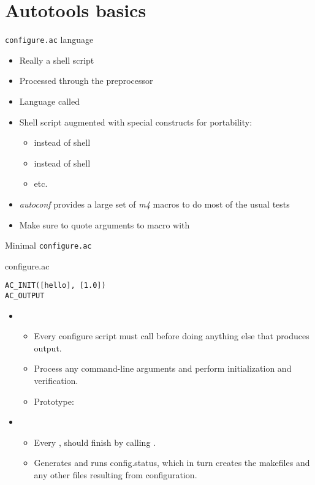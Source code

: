 \section{Autotools basics}

\begin{frame}{{\tt configure.ac} language}
  \begin{itemize}
  \item Really a shell script
  \item Processed through the  preprocessor
  \item Language called 
  \item Shell script augmented with special constructs for portability:
    \begin{itemize}
    \item {} instead of shell 
    \item {} instead of shell 
    \item etc.
    \end{itemize}
  \item {\em autoconf} provides a large set of {\em m4} macros to do
    most of the usual tests
  \item Make sure to quote arguments to macro with \code{[]}
  \end{itemize}
\end{frame}

\begin{frame}[fragile]{Minimal {\tt configure.ac}}
  \begin{block}{configure.ac}
  \begin{verbatim}
AC_INIT([hello], [1.0])
AC_OUTPUT
  \end{verbatim}
  \end{block}
  \begin{itemize}
  \item {}
    \begin{itemize}
    \item Every configure script must call  before doing
      anything else that produces output.
    \item Process any command-line arguments and perform
      initialization and verification.
    \item Prototype:\\
    \end{itemize}
  \item {}
    \begin{itemize}
    \item Every , should finish by calling
      .
    \item Generates and runs config.status, which in turn creates the
      makefiles and any other files resulting from configuration.
    \end{itemize}
  \end{itemize}
\end{frame}

